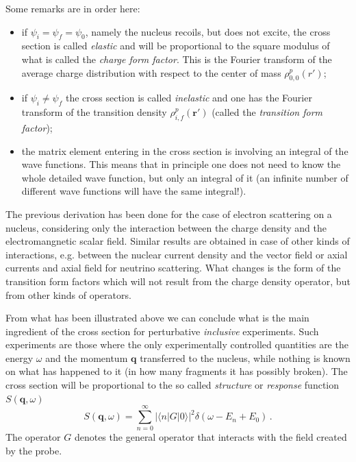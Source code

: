 Some remarks are in order here: 

\begin{itemize}
 \item if $\psi_i=\psi_f=\psi_0$, namely the nucleus recoils, but does not 
excite, the cross section is called {\it elastic} and will be proportional to the square modulus of what is called
the {\it charge form factor}. This is the Fourier transform of the average charge distribution 
with respect to the center of mass $\rho_{0,0}^p(r')$; 
\item if $\psi_i\neq\psi_f$ the cross section is called {\it inelastic}
and one has the Fourier transform of the transition density $\rho^p_{i,f}(\mathbf{r}')$ (called the {\it transition form factor});
\item the matrix element entering in the cross section is involving an integral 
of the wave functions. This means that in principle one does not need to know the whole detailed wave function, but only an 
integral of it (an infinite number of different wave functions will have the same integral!).
\end{itemize}

The previous derivation has been done for the case of electron scattering on a nucleus,
considering only the interaction between the charge density and the electromangnetic scalar field. 
Similar results are obtained in case of other kinds of interactions, e.g. 
between the nuclear current density and the vector  field or axial currents and axial  field for neutrino scattering.
What changes is the form of the transition form factors which will not result from the charge density operator, 
but from other kinds of operators. 

From what has been illustrated above  we can conclude what is the main ingredient of the cross section 
for  perturbative {\it inclusive} experiments. Such experiments are those where
the only experimentally controlled quantities are the energy $\omega$ and the momentum $\mathbf{q}$ transferred 
to the nucleus, while nothing is known on what has happened to it (in how many fragments it has possibly broken).
The cross section will be proportional to the so called {\it structure} or {\it response} function
$S(\mathbf{q}, \omega)$
\begin{equation}\label{S}
S(\mathbf{q},\omega)= \sum_{n=0}^\infty |\langle n|G|0\rangle|^2 \delta(\omega-E_n+E_0)\,.
\end{equation}
The operator $G$ denotes the general operator that interacts with the field created by the probe.

